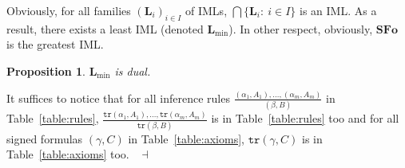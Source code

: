 \documentclass[draft]{article}
\newtheorem{proposition}{Proposition}
\newenvironment{proof}{{\bf Proof:}}{~$\dashv$\\}
\def\Formula{\mathbf{A}}
\def\Formula{\mathbf{F}}
\def\SFo{\mathbf{SFo}}
\def\L{\mathbf{L}}
\begin{document}
%
%
Obviously, for all families $(\L_{i})_{i{\in}I}$ of IMLs, $\bigcap\{\L_{i}:\ i{\in}I\}$ is an IML.
As a result, there exists a least IML (denoted $\L_{\min}$).
In other respect, obviously, $\SFo$ is the greatest IML.
%
%
\begin{proposition}
%
%
$\L_{\min}$ is dual.
%
%
\end{proposition}
%
%
\begin{proof}
%
%
It suffices to notice that for all inference rules $\frac{(\alpha_{1},A_{1}),\ldots,(\alpha_{m},A_{m})}{(\beta,B)}$ in Table~\ref{table:rules}, $\frac{\mathtt{tr}(\alpha_{1},A_{1}),\ldots,\mathtt{tr}(\alpha_{m},A_{m})}{\mathtt{tr}(\beta,B)}$ is in Table~\ref{table:rules} too and for all signed formulas $(\gamma,C)$ in Table~\ref{table:axioms}, $\mathtt{tr}(\gamma,C)$ is in Table~\ref{table:axioms} too.
%
%
\medskip
%
%
\end{proof}
%
%
%
%
%
%
%
%
\end{document}

